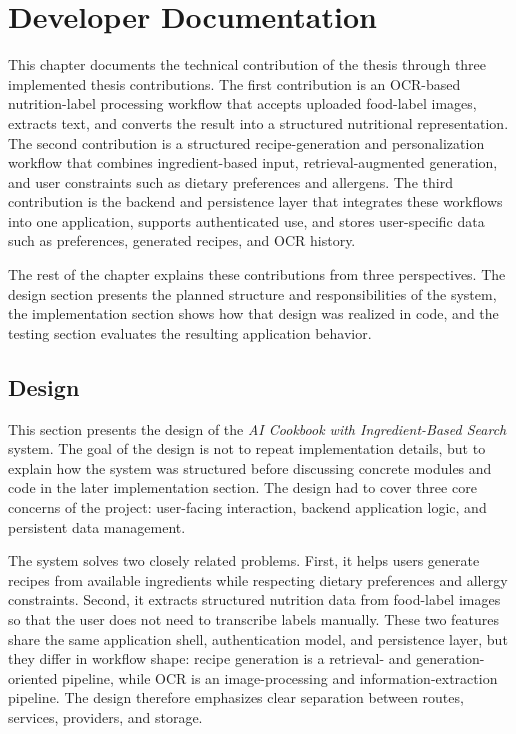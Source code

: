 \cleardoublepage
\chapter{Developer Documentation}
\label{ch:design}

This chapter documents the technical contribution of the thesis through
three implemented thesis contributions. The first contribution is an
OCR-based nutrition-label processing workflow that accepts uploaded
food-label images, extracts text, and converts the result into a
structured nutritional representation. The second contribution is a
structured recipe-generation and personalization workflow that combines
ingredient-based input, retrieval-augmented generation, and user
constraints such as dietary preferences and allergens. The third
contribution is the backend and persistence layer that integrates these
workflows into one application, supports authenticated use, and stores
user-specific data such as preferences, generated recipes, and OCR
history.

The rest of the chapter explains these contributions from three
perspectives. The design section presents the planned structure and
responsibilities of the system, the implementation section shows how
that design was realized in code, and the testing section evaluates the
resulting application behavior.

\cleardoublepage

\section{Design}
\label{sec:design}

This section presents the design of the \emph{AI Cookbook with
Ingredient-Based Search} system. The goal of the design is not to
repeat implementation details, but to explain how the system was
structured before discussing concrete modules and code in the later
implementation section. The design had to cover three core concerns of the project:
user-facing interaction, backend application logic, and persistent
data management.

The system solves two closely related problems. First, it helps users
generate recipes from available ingredients while respecting dietary
preferences and allergy constraints. Second, it extracts structured
nutrition data from food-label images so that the user does not need
to transcribe labels manually. These two features share the same
application shell, authentication model, and persistence layer, but
they differ in workflow shape: recipe generation is a retrieval- and
generation-oriented pipeline, while OCR is an image-processing and
information-extraction pipeline. The design therefore emphasizes clear
separation between routes, services, providers, and storage.

